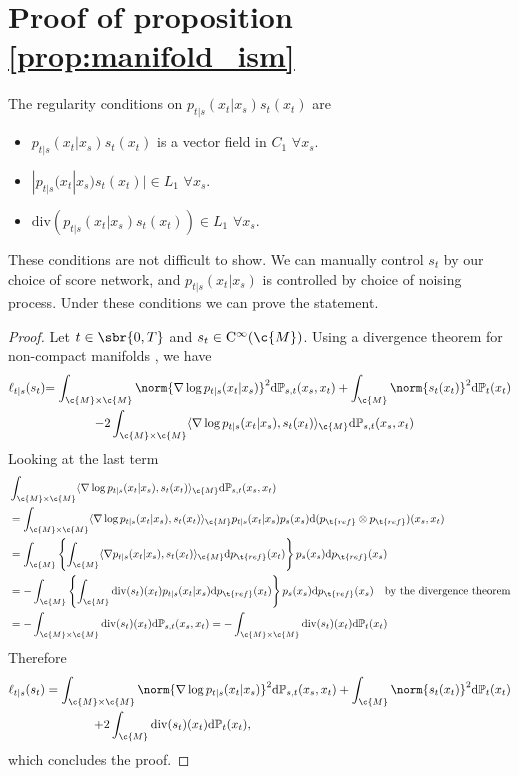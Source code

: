 \section{Proof of proposition \ref{prop:manifold_ism}}
\label{sec:manifold_ism_proof}

The regularity conditions on $p_{t|s}(x_t|x_s)s_t(x_t)$ are \begin{itemize} \item $p_{t|s}(x_t|x_s)s_t(x_t)$ is a vector field in $C_1$ $\forall x_s$.
	\item $|p_{t|s}(x_t|x_s)s_t(x_t)| \in L_1$ $\forall x_s$.
	\item $\mathrm{div}(p_{t|s}(x_t|x_s)s_t(x_t)) \in L_1$ $\forall x_s$.
\end{itemize}
These conditions are not difficult to show.
We can manually control $s_t$ by our choice of score network, and $p_{t|s}(x_t|x_s)$ is controlled by choice of noising process.
Under these conditions we can prove the statement.

\begin{proof}
	Let $t \in \sbr{0,T}$ and $s_t \in \mathrm{C}^\infty(\c{M})$.
	Using a divergence theorem for non-compact manifolds \cite[see][p.2]{gaffney1954}, we have \begin{align} \ell_{t|s}(s_t) &{= \int_{\c{M} \times \c{M}} \norm{\nabla \log p_{t|s}(x_t|x_s)}^2 \mathrm{d} \bb{P}_{s,t}(x_s,x_t) + \int_\c{M} \norm{s_t(x_t)}^2 \mathrm{d} \bb{P}_{t}(x_t)} \\ & \qquad \qquad {- 2 \int_{\c{M} \times \c{M}} \langle \nabla \log p_{t|s}(x_t|x_s), s_t(x_t) \rangle_\c{M} \mathrm{d} \bb{P}_{s,t}(x_s,x_t)} \end{align} Looking at the last term \begin{align} &\int_{\c{M} \times \c{M}} \langle \nabla \log p_{t|s}(x_t|x_s), s_t(x_t) \rangle_\c{M} \mathrm{d} \bb{P}_{s,t}(x_s,x_t)\\ &= \int_{\c{M} \times \c{M}} \langle \nabla \log p_{t|s}(x_t|x_s), s_t(x_t) \rangle_\c{M} p_{t|s}(x_t|x_s)p_s(x_s) \mathrm{d} (p_{\t{ref}} \otimes p_{\t{ref}}) (x_s, x_t) \\ &=\int_{\c{M} } \left\{\int_\c{M} \langle \nabla p_{t|s}(x_t|x_s), s_t(x_t) \rangle_\c{M} \mathrm{d} p_{\t{ref}}(x_t)\right\} p_s(x_s) \mathrm{d} p_{\t{ref}}(x_s) \\ &= -\int_{\c{M} } \left\{\int_\c{M} \mathrm{div}(s_t)(x_t)p_{t|s}(x_t|x_s) \mathrm{d} p_{\t{ref}}(x_t)\right\} p_s(x_s) \mathrm{d} p_{\t{ref}}(x_s) \quad \text{by the divergence theorem} \\ &=- \int_{\c{M} \times \c{M}} \mathrm{div}(s_t)(x_t)\mathrm{d} \bb{P}_{s,t}(x_s,x_t) =- \int_{\c{M} \times \c{M}} \mathrm{div}(s_t)(x_t)\mathrm{d} \bb{P}_{t}(x_t) \end{align} Therefore \begin{align} \ell_{t|s}(s_t) &={\int_{\c{M} \times \c{M}} \norm{\nabla \log p_{t|s}(x_t|x_s)}^2 \mathrm{d} \bb{P}_{s,t}(x_s,x_t) + \int_\c{M} \norm{s_t(x_t)}^2 \mathrm{d} \bb{P}_{t}(x_t)} \\ & \qquad \qquad { +2 \int_{\c{M}} \mathrm{div}(s_t)(x_t)\mathrm{d} \bb{P}_{t}(x_t)} , \end{align} which concludes the proof.
\end{proof}
